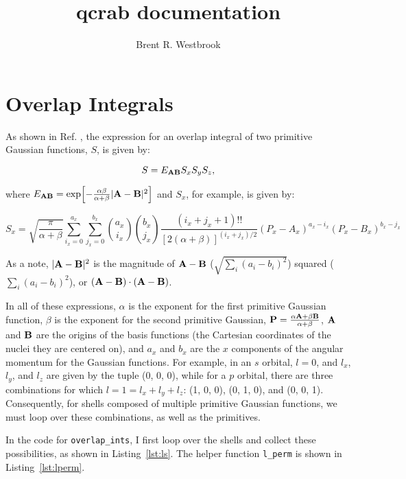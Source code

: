 \documentclass{achemso}
\author{Brent R. Westbrook}
\title{qcrab documentation}
\date{}
\newcommand\eab{E_{\vb A \vb B}}
\begin{document}
\maketitle

\section{Overlap Integrals}
\label{sec:overlap}

As shown in Ref. , the expression for an overlap integral of two
primitive Gaussian functions, $S$, is given by:

\begin{equation}
  \label{eq:s}
  S = \eab S_x S_y S_z,
\end{equation}

\noindent
where $\eab = \exp[-\frac{\alpha\beta}{\alpha + \beta}|\vb A - \vb B|^2]$ and
$S_x$, for example, is given by:

\begin{equation}
  \label{eq:sx}
  S_x = \sqrt{\frac{\pi}{\alpha + \beta}}
  \sum_{i_x = 0}^{a_x}\sum_{j_x = 0}^{b_x}
  \binom{a_x}{i_x} \binom{b_x}{j_x}
  \frac{(i_x + j_x + 1)!!}{[2(\alpha + \beta)]^{(i_x + j_x)/2}}
  (P_x - A_x)^{a_x - i_x}
  (P_x - B_x)^{b_x - j_x}
\end{equation}

\noindent
As a note, $|\vb A - \vb B|^2$ is the magnitude of $\vb A - \vb B$
($\sqrt{\sum_i (a_i - b_i)^2}$) squared ($\sum_i (a_i - b_i)^2$), or
$(\vb A - \vb B) \cdot (\vb A - \vb B)$.

In all of these expressions, $\alpha$ is the exponent for the first primitive
Gaussian function, $\beta$ is the exponent for the second primitive Gaussian,
$\vb P = \frac{\alpha \vb A + \beta \vb B}{\alpha + \beta}$, $\vb A$ and $\vb B$
are the origins of the basis functions (the Cartesian coordinates of the nuclei
they are centered on), and $a_x$ and $b_x$ are the $x$ components of the angular
momentum for the Gaussian functions. For example, in an $s$ orbital, $l = 0$,
and $l_x$, $l_y$, and $l_z$ are given by the tuple (0, 0, 0), while for a $p$
orbital, there are three combinations for which $l = 1 = l_x + l_y + l_z$: (1,
0, 0), (0, 1, 0), and (0, 0, 1). Consequently, for shells composed of multiple
primitive Gaussian functions, we must loop over these combinations, as well as
the primitives.

In the code for \verb|overlap_ints|, I first loop over the shells and collect
these possibilities, as shown in Listing~\ref{lst:ls}. The helper function
\verb|l_perm| is shown in Listing~\ref{lst:lperm}.
\end{document}
